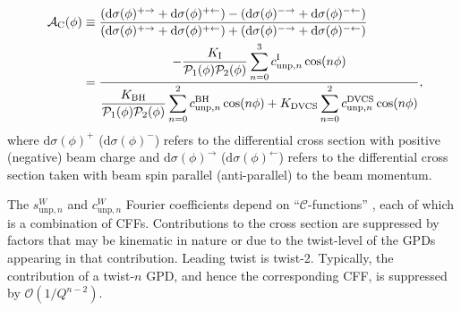 \documentclass[11pt,a4paper]{article}
\begin{document}
\begin{align}
\hspace{0.5cm}\mathcal{A}_{\textrm{C}}(\phi) &\equiv  
\frac{(\textrm{d}\sigma(\phi)^{+\rightarrow} +
\textrm{d}\sigma(\phi)^{+\leftarrow}) -
(\textrm{d}\sigma(\phi)^{-\rightarrow}
+ \textrm{d}\sigma(\phi)^{-\leftarrow})}{(\textrm{d}\sigma(\phi)^{+\rightarrow}
+
\textrm{d}\sigma(\phi)^{+\leftarrow}) +
(\textrm{d}\sigma(\phi)^{-\rightarrow}
+ \textrm{d}\sigma(\phi)^{-\leftarrow})}&    \nonumber \\
&=\dfrac{{-\dfrac{K_{\textrm{I}}}{\mathcal{P}_{1}(\phi)\mathcal{P}_{2}(\phi)}
\displaystyle\sum_{n=0}^3
c_{\textrm{unp},n}^{\textrm{I}}\cos(n\phi)}}{\dfrac{K_{\textrm{BH}}}{\mathcal{P}_{1}
(\phi)\mathcal{P}_
{2}(\phi)}
\displaystyle\sum_{n=0}^2
c_{\textrm{unp},n}^{\textrm{BH}}\cos(n\phi) + 
K_{\textrm{DVCS}}\displaystyle\sum_{n=0}^2 c_{\textrm{unp},n}^{\textrm{DVCS}}\cos(n\phi)} ,&
\label{e:ac}
\end{align}
where $\textrm{d}\sigma(\phi)^+$ ($\textrm{d}\sigma(\phi)^-$) refers to
the differential cross section with positive (negative) beam charge and
$\textrm{d}\sigma(\phi)^\rightarrow$ ($\textrm{d}\sigma(\phi)^\leftarrow$) refers
to the differential cross section taken with beam spin parallel (anti-parallel) to the
beam momentum.

The $s_{\textrm{unp},n}^{W}$ and $c_{\textrm{unp},n}^{W}$ Fourier
coefficients depend on ``$\mathcal{C}$-functions'' \cite{Bel02b}, each of which is a
combination of CFFs. Contributions to the cross section are suppressed by factors that may be kinematic in nature or due to the twist-level of the GPDs appearing in that contribution. Leading twist is twist-2. Typically, the contribution of a twist-$n$ GPD, and hence the corresponding CFF, is
suppressed by $\mathcal{O}(1/Q^{n-2})$. 
\end{document}

